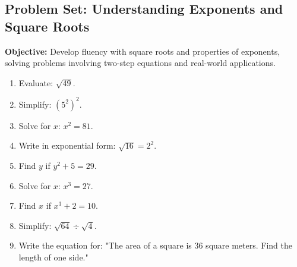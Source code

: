 \documentclass[12pt]{article}
\title{}
\date{}
\begin{document}
\subsection*{Problem Set: Understanding Exponents and Square Roots}
\onehalfspacing

\begin{tcolorbox}[colframe=black!40, colback=gray!5, 
coltitle=black, colbacktitle=black!20, fonttitle=\bfseries\Large, 
title=Learning Objective, halign title=center, left=5pt, right=5pt, top=5pt, bottom=15pt]
\textbf{Objective:} Develop fluency with square roots and properties of exponents, solving problems involving two-step equations and real-world applications.
\end{tcolorbox}

\begin{tcolorbox}[colframe=black!60, colback=white, 
coltitle=black, colbacktitle=black!15, fonttitle=\bfseries\Large, 
title=Exercises, halign title=center, left=10pt, right=10pt, top=10pt, bottom=60pt]
\begin{enumerate}[itemsep=3em]
    \item Evaluate: \( \sqrt{49} \).
    \item Simplify: \( (5^2)^2 \).
    \item Solve for \(x\): \( x^2 = 81 \).
    \item Write in exponential form: \( \sqrt{16} = 2^2 \).
    \item Find \(y\) if \(y^2 + 5 = 29\).
      \item Solve for \(x\): \( x^3 = 27 \).
    \item Find \(x\) if \(x^3 + 2 = 10\).
    \item Simplify: \( \sqrt{64} \div \sqrt{4} \).
    \item Write the equation for: "The area of a square is 36 square meters. Find the length of one side."
\end{enumerate}
\end{tcolorbox}

\vspace{1em}
\end{document}
